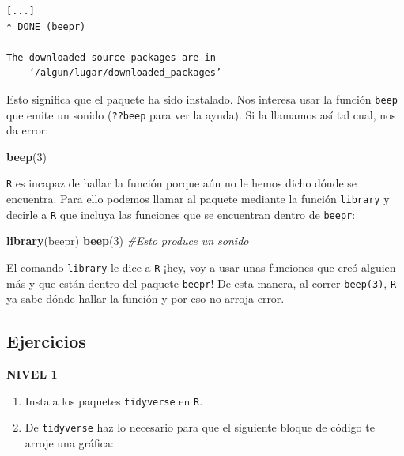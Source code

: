 \documentclass[
]{book}
\newenvironment{Shaded}{\begin{snugshade}}{\end{snugshade}}
\newcommand{\CommentTok}[1]{\textcolor[rgb]{0.56,0.35,0.01}{\textit{#1}}}
\newcommand{\DecValTok}[1]{\textcolor[rgb]{0.00,0.00,0.81}{#1}}
\newcommand{\KeywordTok}[1]{\textcolor[rgb]{0.13,0.29,0.53}{\textbf{#1}}}
\newcommand{\NormalTok}[1]{#1}
\providecommand{\tightlist}{%
  \setlength{\itemsep}{0pt}\setlength{\parskip}{0pt}}
\begin{document}
\begin{verbatim}
[...]
* DONE (beepr)

The downloaded source packages are in
	‘/algun/lugar/downloaded_packages’
\end{verbatim}

Esto significa que el paquete ha sido instalado. Nos interesa usar la función \texttt{beep} que emite un sonido (\texttt{??beep} para ver la ayuda). Si la llamamos así tal cual, nos da error:

\begin{Shaded}
\begin{Highlighting}[]
\KeywordTok{beep}\NormalTok{(}\DecValTok{3}\NormalTok{)}
\end{Highlighting}
\end{Shaded}

\texttt{R} es incapaz de hallar la función porque aún no le hemos dicho dónde se encuentra. Para ello podemos llamar al paquete mediante la función \texttt{library} y decirle a \texttt{R} que incluya las funciones que se encuentran dentro de \texttt{beepr}:

\begin{Shaded}
\begin{Highlighting}[]
\KeywordTok{library}\NormalTok{(beepr)}
\KeywordTok{beep}\NormalTok{(}\DecValTok{3}\NormalTok{) }\CommentTok{#Esto produce un sonido}
\end{Highlighting}
\end{Shaded}

El comando \texttt{library} le dice a \texttt{R} ¡hey, voy a usar unas funciones que creó alguien más y que están dentro del paquete \texttt{beepr}! De esta manera, al correr \texttt{beep(3)}, \texttt{R} ya sabe dónde hallar la función y por eso no arroja error.

\hypertarget{ejercicios-1}{%
\subsection{Ejercicios}\label{ejercicios-1}}

\textbf{NIVEL 1}

\begin{enumerate}
\def\labelenumi{\arabic{enumi}.}
\tightlist
\item
  Instala los paquetes \texttt{tidyverse} en \texttt{R}.
\item
  De \texttt{tidyverse} haz lo necesario para que el siguiente bloque de código te arroje una gráfica:
\end{enumerate}
\end{document}
